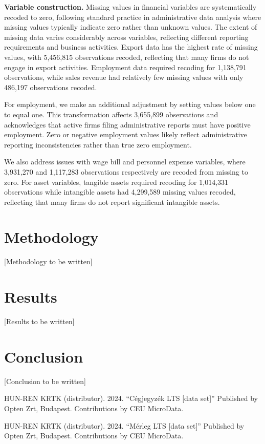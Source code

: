 \documentclass[11pt,a4paper]{article}
\begin{document}
\textbf{Variable construction.} Missing values in financial variables are systematically recoded to zero, following standard practice in administrative data analysis where missing values typically indicate zero rather than unknown values. The extent of missing data varies considerably across variables, reflecting different reporting requirements and business activities. Export data has the highest rate of missing values, with 5,456,815 observations recoded, reflecting that many firms do not engage in export activities. Employment data required recoding for 1,138,791 observations, while sales revenue had relatively few missing values with only 486,197 observations recoded.

For employment, we make an additional adjustment by setting values below one to equal one. This transformation affects 3,655,899 observations and acknowledges that active firms filing administrative reports must have positive employment. Zero or negative employment values likely reflect administrative reporting inconsistencies rather than true zero employment.

We also address issues with wage bill and personnel expense variables, where 3,931,270 and 1,117,283 observations respectively are recoded from missing to zero. For asset variables, tangible assets required recoding for 1,014,331 observations while intangible assets had 4,299,589 missing values recoded, reflecting that many firms do not report significant intangible assets.

\section{Methodology}

[Methodology to be written]

\section{Results}

[Results to be written]

\section{Conclusion}

[Conclusion to be written]


\begin{thebibliography}{}

 HUN-REN KRTK (distributor). 2024. ``Cégjegyzék LTS [data set]'' Published by Opten Zrt, Budapest. Contributions by CEU MicroData.

 HUN-REN KRTK (distributor). 2024. ``Mérleg LTS [data set]'' Published by Opten Zrt, Budapest. Contributions by CEU MicroData.

\end{thebibliography}
\end{document}
